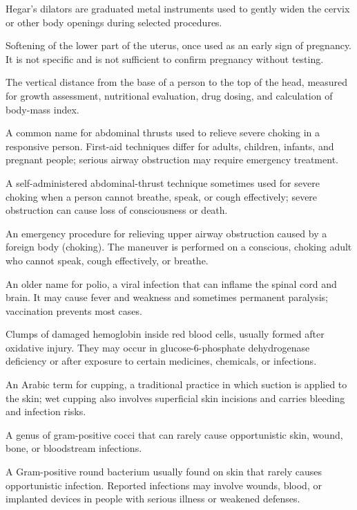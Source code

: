  Hegar's dilators are graduated metal instruments used to gently widen the cervix or other body openings during selected procedures.

 Softening of the lower part of the uterus, once used as an early sign of pregnancy. It is not specific and is not sufficient to confirm pregnancy without testing.

 The vertical distance from the base of a person to the top of the head, measured for growth assessment, nutritional evaluation, drug dosing, and calculation of body-mass index.

 A common name for abdominal thrusts used to relieve severe choking in a responsive person. First-aid techniques differ for adults, children, infants, and pregnant people; serious airway obstruction may require emergency treatment.

 A self-administered abdominal-thrust technique sometimes used for severe choking when a person cannot breathe, speak, or cough effectively; severe obstruction can cause loss of consciousness or death.

 An emergency procedure for relieving upper airway obstruction caused by a foreign body
(choking). The maneuver is performed on a conscious, choking adult who cannot speak,
cough effectively, or breathe.

 An older name for polio, a viral infection that can inflame the spinal cord and brain. It may cause fever and weakness and sometimes permanent paralysis; vaccination prevents most cases.

 Clumps of damaged hemoglobin inside red blood cells, usually formed after oxidative injury. They may occur in glucose-6-phosphate dehydrogenase deficiency or after exposure to certain medicines, chemicals, or infections.

 An Arabic term for cupping, a traditional practice in which suction is applied to the skin; wet cupping also involves superficial skin incisions and carries bleeding and infection risks.

 A genus of gram-positive cocci that can rarely cause opportunistic skin, wound, bone, or bloodstream infections.

 A Gram-positive round bacterium usually found on skin that rarely causes opportunistic infection. Reported infections may involve wounds, blood, or implanted devices in people with serious illness or weakened defenses.

